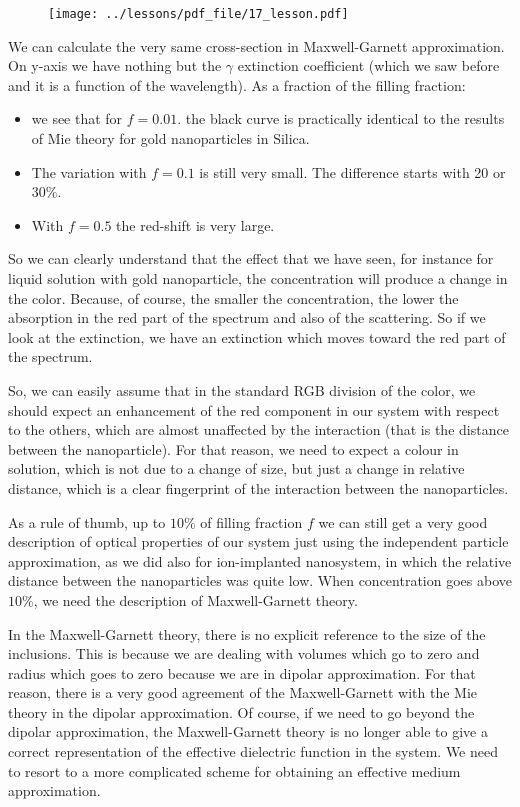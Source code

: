 \documentclass[../main/main.tex]{subfiles}
\begin{document}
\begin{figure}[h!]
\centering
\texttt{[image: ../lessons/pdf\_file/17\_lesson.pdf]}
\end{figure}

 We can calculate the very same cross-section in Maxwell-Garnett approximation.
 On y-axis we have nothing but the $\gamma$ extinction coefficient (which we saw before and it is a function of the wavelength).
 As a fraction of the filling fraction:
\begin{itemize}
\item  we see that for $f=0.01$. the black curve is practically identical to the results of Mie theory for gold nanoparticles in Silica.
\item The variation with $f=0.1$ is still very small. The difference starts with 20 or 30$\%$.
\item With $f=0.5$ the red-shift is very large.
\end{itemize}
So we can clearly understand that the effect that we have seen, for instance for liquid solution with gold nanoparticle, the concentration will produce a change in the color.
Because, of course, the smaller the concentration, the lower the absorption in the red part of the spectrum and also of the scattering.
So if we look at the extinction, we have an extinction which moves toward the red part of the spectrum.

So, we can easily assume that in the standard RGB division of the color,  we should expect an enhancement of the red component in our system with respect to the others, which are almost unaffected by the interaction (that is the distance between the nanoparticle).
For that reason, we need to expect a colour in solution, which is not due to a change of size, but just a change in relative distance, which is a clear fingerprint of the interaction between the nanoparticles.

As a rule of thumb, up to $10 \%$ of filling fraction $f$ we can still get a very good description of optical properties of our system just using the independent particle approximation, as we did also for ion-implanted nanosystem, in which the relative distance between the nanoparticles was quite low.
When concentration goes above $10 \%$, we need the description of Maxwell-Garnett theory.

In the Maxwell-Garnett theory, there is no explicit reference to the size of the inclusions. This is because we are dealing with volumes which go to zero and radius which goes to zero because we are in dipolar approximation. For that reason, there is a very good agreement of the Maxwell-Garnett with the Mie theory in the dipolar approximation.
Of course, if we need to go beyond the dipolar approximation, the Maxwell-Garnett theory is no longer able to give a correct representation of the effective dielectric function in the system. We need to resort to a more complicated scheme for obtaining an effective medium approximation.
\end{document}
